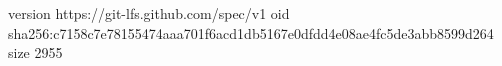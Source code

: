 version https://git-lfs.github.com/spec/v1
oid sha256:c7158c7e78155474aaa701f6acd1db5167e0dfdd4e08ae4fc5de3abb8599d264
size 2955
